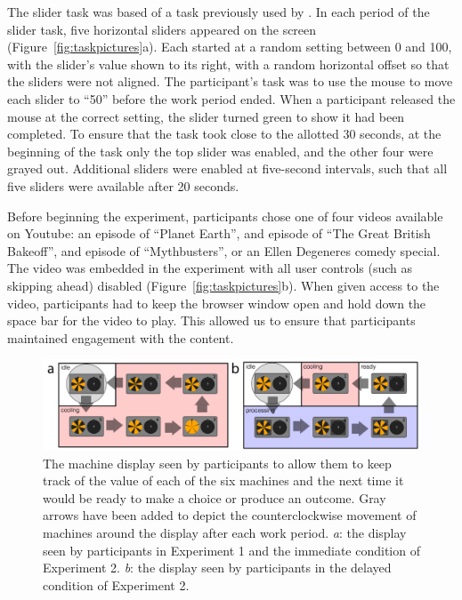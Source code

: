\documentclass[10pt,letterpaper]{article}
\begin{document}
The slider task was based of a task previously used by \citet{Gill2012}. In each
period of the slider task, five horizontal sliders appeared on the screen (Figure~\ref{fig:taskpictures}a). Each
started at a random setting between 0 and 100, with the slider's value
shown to its right, with a random horizontal offset so that the
sliders were not aligned. The participant's task was to use the mouse to move
each slider to ``50'' before the work period ended. When a participant released
the mouse at the correct setting, the slider turned green to show it had been
completed. To ensure that the task took close to the allotted 30 seconds, at the
beginning of the task only the top slider was enabled, and the other four were
grayed out. Additional sliders were enabled at five-second intervals, such that
all five sliders were available after 20 seconds.

Before beginning the experiment, participants chose one of four videos available
on Youtube: an episode of ``Planet Earth'', and episode of ``The Great British
Bakeoff'', and episode of ``Mythbusters'', or an Ellen Degeneres comedy special.
The video was embedded in the experiment with all user controls (such as
skipping ahead) disabled (Figure~\ref{fig:taskpictures}b). When given access to the video, participants had to keep the
browser window open and hold down the space bar for the video to play. This allowed us to ensure that
participants maintained engagement with the content.

\begin{figure}
\centering
\includegraphics[width=\textwidth]{figures/machinemappictures.png}
\caption{The machine display seen by participants to allow them to keep track of
  the value of each of the six machines and the next time it would be ready to
  make a choice or produce an outcome. Gray arrows have been added to depict the
  counterclockwise movement of machines around the display after each work
  period.
  \emph{a}: the display seen by participants in Experiment 1 and the immediate condition of Experiment 2.
  \emph{b}: the display seen by participants in the delayed condition of
  Experiment 2.}
\label{fig:machinemappictures}
\end{figure}
\end{document}
